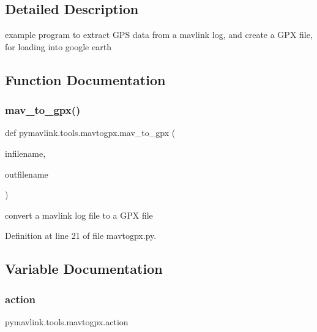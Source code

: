 \subsection{Detailed Description}
\begin{DoxyVerb}example program to extract GPS data from a mavlink log, and create a GPX
file, for loading into google earth
\end{DoxyVerb}
 

\subsection{Function Documentation}
\mbox{\label{namespacepymavlink_1_1tools_1_1mavtogpx_a76a1d5d7118b71ed2aea6781eedc6d13}} 
\subsubsection{\texorpdfstring{mav\_to\_gpx()}{mav\_to\_gpx()}}
{\footnotesize\ttfamily def pymavlink.\+tools.\+mavtogpx.\+mav\+\_\+to\+\_\+gpx (\begin{DoxyParamCaption}\item[{}]{infilename,  }\item[{}]{outfilename }\end{DoxyParamCaption})}

\begin{DoxyVerb}convert a mavlink log file to a GPX file\end{DoxyVerb}
 

Definition at line 21 of file mavtogpx.\+py.



\subsection{Variable Documentation}
\mbox{\label{namespacepymavlink_1_1tools_1_1mavtogpx_a5b8088a7b7159e3846832a309ab5a03d}} 
\subsubsection{\texorpdfstring{action}{action}}
{\footnotesize\ttfamily pymavlink.\+tools.\+mavtogpx.\+action}



